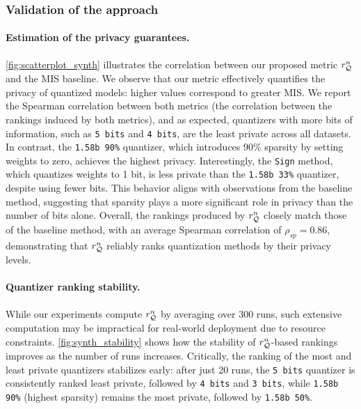 \subsubsection{Validation of the approach}
\label{sssec:val}
\paragraph{Estimation of the privacy guarantees.}
\autoref{fig:scatterplot_synth} illustrates the correlation between our proposed metric $r_{{\mathcal{Q}}}^n$ and the MIS baseline.
We observe that our metric effectively quantifies the privacy of quantized models: higher values correspond to greater MIS.
We report the Spearman correlation between both metrics (the correlation between the rankings induced by both metrics), and as expected, quantizers with more bits of information, such as \texttt{5 bits} and \texttt{4 bits}, are the least private across all datasets.
In contrast, the \texttt{1.58b 90\%} quantizer, which introduces 90\% sparsity by setting weights to zero, achieves the highest privacy.
Interestingly, the \texttt{Sign} method, which quantizes weights to 1 bit, is less private than the \texttt{1.58b 33\%} quantizer, despite using fewer bits.
This behavior aligns with observations from the baseline method, suggesting that sparsity plays a more significant role in privacy than the number of bits alone.
Overall, the rankings produced by $r_{{\mathcal{Q}}}^n$ closely match those of the baseline method, with an average Spearman correlation of $\rho_{sp}=0.86$, demonstrating that $r_{{\mathcal{Q}}}^n$ reliably ranks quantization methods by their privacy levels.

\paragraph{Quantizer ranking stability.}
While our experiments compute $r_{{\mathcal{Q}}}^n$ by averaging over 300 runs, such extensive computation may be impractical for real-world deployment due to resource constraints.
\autoref{fig:synth_stability} shows how the stability of $r_{{\mathcal{Q}}}^n$-based rankings improves as the number of runs increases.
Critically, the ranking of the most and least private quantizers stabilizes early: after just 20 runs, the \texttt{5 bits} quantizer is consistently ranked least private, followed by \texttt{4 bits} and \texttt{3 bits}, while \texttt{1.58b 90\%} (highest sparsity) remains the most private, followed by \texttt{1.58b 50\%}.

